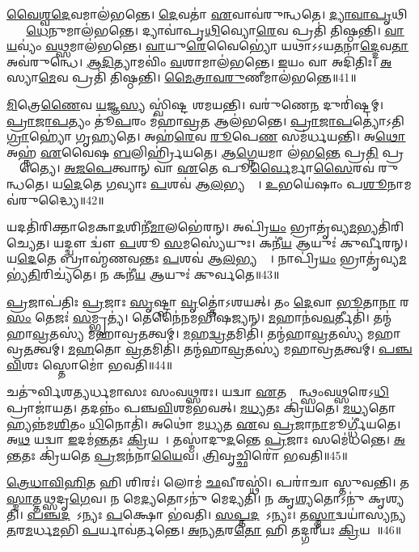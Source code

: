 \ul{𑌵𑍈}\ul{𑌶𑍍𑌵}\ul{𑌦𑍇}𑌵𑌮𑌾𑌲॑𑌭𑌨𑍍𑌤𑍇।
\ul{𑌦𑍇}𑌵𑌤𑌾॑ \ul{𑌏}𑌵𑌾𑌵॑𑌰𑍁𑌨𑍍𑌧𑌤𑍇।
\ul{𑌦𑍍𑌯𑌾}\ul{𑌵𑌾}\ul{𑌪𑍃}𑌥𑌿𑌵𑍍𑌯𑌾𑌂᳚ \ul{𑌧𑍇}𑌨𑍁𑌮𑌾𑌲॑𑌭𑌨𑍍𑌤𑍇।
𑌦𑍍𑌯𑌾𑌵𑌾॑𑌪𑍃\ul{𑌥𑌿}𑌵𑍍𑌯𑍋\ul{𑌰𑍇}𑌵 𑌪𑍍𑌰𑌤𑌿॑ 𑌤𑌿𑌷𑍍𑌠𑌨𑍍𑌤𑌿।
\ul{𑌵𑌾}\ul{𑌯}𑌵𑍍𑌯𑌂॑ \ul{𑌵}𑌥𑍍𑌸𑌮𑌾𑌲॑𑌭𑌨𑍍𑌤𑍇।
\ul{𑌵𑌾}𑌯𑍁\ul{𑌰𑍇}𑌵𑍈𑌭𑍍𑌯𑍋॑ 𑌯𑌥𑌾\-𑌽𑌽𑌯\ul{𑌤}𑌨𑌾\ul{𑌦𑍍𑌦𑍇}𑌵\ul{𑌤𑌾} 𑌅𑌵॑𑌰𑍁𑌨𑍍𑌧𑍇।
\ul{𑌆}\ul{𑌦𑌿}𑌤𑍍𑌯𑌾𑌮𑌵𑌿𑌂॑ \ul{𑌵}𑌶𑌾𑌮𑌾𑌲॑𑌭𑌨𑍍𑌤𑍇।
\ul{𑌇}𑌯𑌂 𑌵𑌾 𑌅𑌦𑌿॑𑌤𑌿𑌃।
\ul{𑌅}𑌸𑍍𑌯𑌾\ul{𑌮𑍇}𑌵 𑌪𑍍𑌰𑌤𑌿॑ 𑌤𑌿𑌷𑍍𑌠𑌨𑍍𑌤𑌿।
\ul{𑌮𑍈}\ul{𑌤𑍍𑌰𑌾}\ul{𑌵}\ul{𑌰𑍁}𑌣𑍀𑌮𑌾𑌲॑𑌭𑌨𑍍𑌤𑍇॥41॥

\ul{𑌮𑌿}𑌤𑍍𑌰𑍇\ul{𑌣𑍈}𑌵 \ul{𑌯}𑌜𑍍𑌞\ul{𑌸𑍍𑌯} 𑌸𑍍𑌵𑌿॑𑌷𑍍𑌟 𑌶𑌮𑌯𑌨𑍍𑌤𑌿।
𑌵𑌰𑍁॑𑌣𑍇\ul{𑌨} 𑌦𑍁𑌰𑌿॑𑌷𑍍𑌟𑌮𑍍।
\ul{𑌪𑍍𑌰𑌾}\ul{𑌜𑌾}\ul{𑌪}𑌤𑍍𑌯𑌂 𑌤𑍂॑\ul{𑌪}𑌰𑌂 𑌮॑𑌹𑌾\ul{𑌵𑍍𑌰}𑌤 𑌆𑌲॑𑌭𑌨𑍍𑌤𑍇।
\ul{𑌪𑍍𑌰𑌾}\ul{𑌜𑌾}\ul{𑌪}𑌤𑍍𑌯𑍋॑\-𑌽𑌤𑌿\ul{𑌗𑍍𑌰𑌾}𑌹𑍍𑌯𑍋॑ 𑌗𑍃𑌹𑍍𑌯𑌤𑍇।
𑌅𑌹॑\ul{𑌰𑍇}𑌵 \ul{𑌰𑍂}𑌪𑍇\ul{𑌣} 𑌸𑌮॑𑌰𑍍𑌧𑌯𑌨𑍍𑌤𑌿।
𑌅\ul{𑌥𑍋} 𑌅𑌹𑍍𑌨॑ \ul{𑌏}𑌵𑍈𑌷 \ul{𑌬}𑌲𑌿𑌰𑍍\mbox{}𑌹𑍍𑌰𑌿॑𑌯𑌤𑍇।
\ul{𑌆}\ul{𑌗𑍍𑌨𑍇}𑌯𑌮𑌾 𑌲॑𑌭\ul{𑌨𑍍𑌤𑍇} 𑌪𑍍𑌰\ul{𑌤𑌿} 𑌪𑍍𑌰𑌜𑍍𑌞𑌾᳚𑌤𑍍𑌯𑍈।
\ul{𑌅}\ul{𑌜}\ul{𑌪𑍇}𑌤𑍍𑌵𑌾𑌨𑍍 𑌵𑌾 \ul{𑌏}𑌤𑍇 𑌪𑍂\ul{𑌰𑍍𑌵𑍈}𑌰𑍍𑌮𑌾\ul{𑌸𑍈}𑌰𑌵॑ 𑌰𑍁𑌨𑍍𑌧𑌤𑍇।
𑌯\ul{𑌦𑍇}𑌤𑍇 \ul{𑌗}𑌵𑍍𑌯𑌾𑌃 \ul{𑌪}𑌶𑌵॑ 𑌆\ul{𑌲}𑌭𑍍𑌯𑌨𑍍𑌤𑍇᳚।
\ul{𑌉}𑌭𑌯𑍇॑𑌷𑌾𑌂 𑌪\ul{𑌶𑍂}𑌨𑌾𑌮𑌵॑𑌰𑍁𑌦𑍍𑌧𑍍𑌯𑍈॥42॥

𑌯𑌦𑌤𑌿॑𑌰𑌿𑌕𑍍𑌤𑌾𑌮𑍇𑌕𑌾\ul{𑌦}𑌶𑌿𑌨𑍀॑\ul{𑌮𑌾}𑌲𑌭𑍇॑𑌰𑌨𑍍।
𑌅𑌪𑍍𑌰𑌿॑\ul{𑌯𑌂} 𑌭𑍍𑌰𑌾𑌤𑍃॑𑌵𑍍𑌯\ul{𑌮}𑌭𑍍𑌯𑌤𑌿॑\-𑌰𑌿𑌚𑍍𑌯𑍇𑌤।
𑌯𑌦𑍍𑌦𑍍𑌵𑍗 𑌦𑍍𑌵𑍗॑ \ul{𑌪}𑌶𑍂 \ul{𑌸}𑌮𑌸𑍍𑌯𑍇॑𑌯𑍁𑌃।
𑌕𑌨𑍀॑\ul{𑌯} 𑌆𑌯𑍁𑌃॑ 𑌕𑍁𑌰𑍍𑌵𑍀𑌰𑌨𑍍।
𑌯\ul{𑌦𑍇}𑌤𑍇 𑌬𑍍𑌰𑌾𑌹𑍍𑌮॑𑌣𑌵𑌨𑍍𑌤𑌃 \ul{𑌪}𑌶𑌵॑ 𑌆\ul{𑌲}𑌭𑍍𑌯𑌨𑍍𑌤𑍇᳚।
𑌨𑌾𑌪𑍍𑌰𑌿॑\ul{𑌯𑌂} 𑌭𑍍𑌰𑌾𑌤𑍃॑𑌵𑍍𑌯\ul{𑌮}𑌭𑍍𑌯॑\ul{𑌤𑌿}𑌰𑌿𑌚𑍍𑌯॑𑌤𑍇।
𑌨 𑌕𑌨𑍀॑\ul{𑌯} 𑌆𑌯𑍁𑌃॑ 𑌕𑍁𑌰𑍍𑌵𑌤𑍇॥43॥\anuvakamend[𑌤𑍇 \ul{𑌏}𑌵𑌾𑌲॑𑌭𑌨𑍍𑌤𑍇 𑌮𑍈𑌤𑍍𑌰𑌾𑌵\ul{𑌰𑍁}𑌣𑍀𑌮𑌾𑌲॑\ul{𑌭}𑌨𑍍𑌤𑍇\-𑌽𑌵॑𑌰𑍁𑌦𑍍𑌧𑍍𑌯𑍈 \ul{𑌸}𑌪𑍍𑌤 𑌚॑]

\ul{𑌪𑍍𑌰}𑌜𑌾𑌪॑𑌤𑌿𑌃 \ul{𑌪𑍍𑌰}𑌜𑌾𑌃 \ul{𑌸𑍃}𑌷𑍍𑌟𑍍𑌵𑌾 \ul{𑌵𑍃}𑌤𑍍𑌤𑍋॑\-𑌽𑌶𑌯𑌤𑍍।
𑌤𑌂 \ul{𑌦𑍇}𑌵𑌾 \ul{𑌭𑍂}𑌤𑌾\ul{𑌨𑌾}\ul{} 𑌰\ul{𑌸𑌂} 𑌤𑍇𑌜𑌃॑ \ul{𑌸}𑌮𑍍𑌭𑍃𑌤𑍍𑌯॑।
𑌤𑍇𑌨𑍈॑𑌨𑌮𑌭𑌿𑌷𑌜𑍍𑌯𑌨𑍍।
\ul{𑌮}𑌹𑌾𑌨॑𑌵\ul{𑌵}𑌰𑍍𑌤𑍀𑌤𑌿॑।
𑌤𑌨𑍍𑌮॑𑌹𑌾\ul{𑌵𑍍𑌰}𑌤𑌸𑍍𑌯॑ 𑌮𑌹𑌾𑌵𑍍𑌰\ul{𑌤}𑌤𑍍𑌵𑌮𑍍।
\ul{𑌮}𑌹\ul{𑌦𑍍𑌵𑍍𑌰}𑌤𑌮𑌿𑌤𑌿॑।
𑌤𑌨𑍍𑌮॑𑌹𑌾\ul{𑌵𑍍𑌰}𑌤𑌸𑍍𑌯॑ 𑌮𑌹𑌾𑌵𑍍𑌰\ul{𑌤}𑌤𑍍𑌵𑌮𑍍।
\ul{𑌮}\ul{𑌹}𑌤𑍋 \ul{𑌵𑍍𑌰}𑌤𑌮𑌿𑌤𑌿॑।
𑌤𑌨𑍍𑌮॑𑌹𑌾\ul{𑌵𑍍𑌰}𑌤𑌸𑍍𑌯॑ 𑌮𑌹𑌾𑌵𑍍𑌰\ul{𑌤}𑌤𑍍𑌵𑌮𑍍।
\ul{𑌪}\ul{𑌞𑍍𑌚}\ul{𑌵𑌿}\ul{}𑌶𑌃 𑌸𑍍𑌤𑍋𑌮𑍋॑ 𑌭𑌵𑌤𑌿॥44॥

𑌚𑌤𑍁॑𑌰𑍍𑌵𑌿𑌶𑌤𑍍𑌯𑌰𑍍𑌧𑌮𑌾𑌸𑌃 𑌸𑌂𑌵\ul{𑌥𑍍𑌸}𑌰𑌃।
𑌯𑌦𑍍𑌵𑌾 \ul{𑌏}𑌤𑌸𑍍𑌮𑌿᳚𑌨𑍍𑌥𑍍𑌸𑌂𑌵\ul{𑌥𑍍𑌸}𑌰𑍇𑌽\ul{𑌧𑌿} 𑌪𑍍𑌰𑌾𑌜𑌾॑𑌯𑌤।
𑌤𑌦𑌨𑍍𑌨𑌂॑ 𑌪𑌞𑍍𑌚\ul{𑌵𑌿}\ul{}𑌶𑌮॑𑌭𑌵𑌤𑍍।
\ul{𑌮}\ul{𑌧𑍍𑌯}𑌤𑌃 𑌕𑍍𑌰𑌿॑𑌯𑌤𑍇।
\ul{𑌮}\ul{𑌧𑍍𑌯}𑌤𑍋 𑌹𑍍𑌯𑌨𑍍𑌨॑𑌮\ul{𑌶𑌿}𑌤𑌂 \ul{𑌧𑌿}𑌨𑍋𑌤𑌿॑।
𑌅𑌥𑍋॑ 𑌮\ul{𑌧𑍍𑌯}𑌤 \ul{𑌏}𑌵 \ul{𑌪𑍍𑌰}𑌜𑌾\ul{𑌨𑌾}𑌮𑍂𑌰𑍍𑌗𑍍𑌧𑍀॑𑌯𑌤𑍇।
𑌅\ul{𑌥} 𑌯𑌦𑍍𑌵𑌾 \ul{𑌇}𑌦𑌮॑\ul{𑌨𑍍𑌤}𑌤𑌃 \ul{𑌕𑍍𑌰𑌿}𑌯𑌤𑍇᳚।
𑌤𑌸𑍍𑌮𑌾॑𑌦𑍁\ul{𑌦}𑌨𑍍𑌤𑍇 \ul{𑌪𑍍𑌰}𑌜𑌾𑌃 𑌸𑌮𑍇॑𑌧𑌨𑍍𑌤𑍇।
\ul{𑌅}\ul{𑌨𑍍𑌤}𑌤𑌃 𑌕𑍍𑌰𑌿॑𑌯𑌤𑍇 \ul{𑌪𑍍𑌰}𑌜𑌨॑𑌨𑌾\ul{𑌯𑍈}𑌵।
\ul{𑌤𑍍𑌰𑌿}𑌵𑍃𑌚𑍍𑌛𑌿𑌰𑍋॑ 𑌭𑌵𑌤𑌿॥45॥

\ul{𑌤𑍍𑌰𑍇}\ul{𑌧𑌾}\ul{𑌵𑌿}\ul{𑌹𑌿}𑌤 𑌹𑌿 𑌶𑌿𑌰𑌃॑।
𑌲𑍋𑌮॑ \ul{𑌛}𑌵𑍀𑌰𑌸𑍍𑌥𑌿॑।
𑌪𑌰𑌾॑𑌚𑌾 𑌸𑍍𑌤𑍁𑌵𑌨𑍍𑌤𑌿।
𑌤\ul{𑌸𑍍𑌮𑌾}𑌤𑍍𑌤\ul{𑌥𑍍𑌸}𑌦𑍃\ul{𑌗𑍇}𑌵।
𑌨 𑌮𑍇\ul{𑌦𑍍𑌯}𑌤𑍋𑌽𑌨𑍁॑ 𑌮𑍇𑌦𑍍𑌯𑌤𑌿।
𑌨 𑌕𑍃\ul{𑌶𑍍𑌯}𑌤𑍋𑌽𑌨𑍁॑ 𑌕𑍃𑌶𑍍𑌯𑌤𑌿।
\ul{𑌪}\ul{𑌞𑍍𑌚}\ul{𑌦}𑌶𑍋᳚\-𑌽𑌨𑍍𑌯𑌃 \ul{𑌪}𑌕𑍍𑌷𑍋 𑌭॑𑌵𑌤𑌿।
\ul{𑌸}\ul{𑌪𑍍𑌤}\ul{𑌦}𑌶𑍋᳚\-𑌽𑌨𑍍𑌯𑌃।
𑌤\ul{𑌸𑍍𑌮𑌾}𑌦𑍍𑌵𑌯𑌾॑𑌸𑍍𑌯𑌨𑍍𑌯\ul{𑌤}𑌰\ul{𑌮}𑌰𑍍𑌧\ul{𑌮}𑌭𑌿 \ul{𑌪}𑌰𑍍𑌯𑌾𑌵॑𑌰𑍍𑌤𑌨𑍍𑌤𑍇।
\ul{𑌅}\ul{𑌨𑍍𑌯}\ul{𑌤}𑌰\ul{𑌤𑍋} 𑌹𑌿 𑌤𑌦𑍍𑌗𑌰𑍀॑𑌯𑌃 \ul{𑌕𑍍𑌰𑌿}𑌯𑌤𑍇᳚॥46॥

